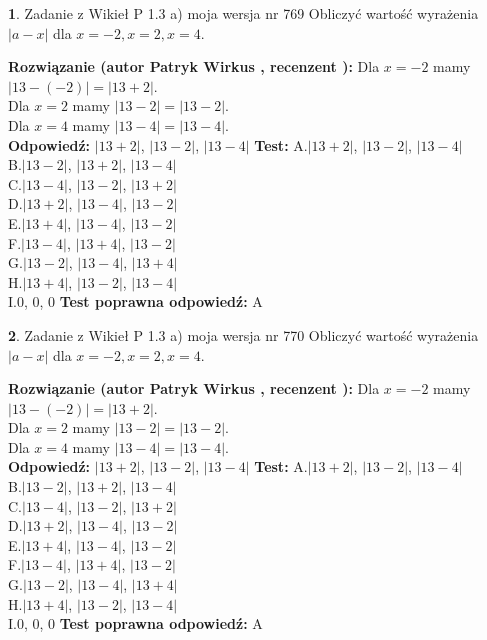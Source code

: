 \documentclass[12pt, a4paper]{article}
\theoremstyle{definition} %
\newtheorem{zad}{}
\newcommand{\zadStart}[1]{\begin{zad}#1\newline}
\newcommand{\zadStop}{\end{zad}}
\newcommand{\rozwStart}[2]{\noindent \textbf{Rozwiązanie (autor #1 , recenzent #2): }\newline}
\newcommand{\rozwStop}{\newline}
\newcommand{\odpStart}{\noindent \textbf{Odpowiedź:}\newline}
\newcommand{\odpStop}{\newline}
\newcommand{\testStart}{\noindent \textbf{Test:}\newline}
\newcommand{\testStop}{\newline}
\newcommand{\kluczStart}{\noindent \textbf{Test poprawna odpowiedź:}\newline}
\newcommand{\kluczStop}{\newline}
\begin{document}
\zadStart{Zadanie z Wikieł P 1.3 a) moja wersja nr 769}
Obliczyć wartość wyrażenia $|a - x|$ dla $x=-2,x=2,x=4$.
\zadStop
\rozwStart{Patryk Wirkus}{}
Dla $x = -2$ mamy $|13 - (-2)| = |13 + 2|$.\\
Dla $x = 2$ mamy $|13 - 2| = |13 - 2|$.\\
Dla $x = 4$ mamy $|13 - 4| = |13 - 4|$.\\
\rozwStop
\odpStart
$|13 + 2|$, $|13 - 2|$, $|13 - 4|$
\odpStop
\testStart
A.$|13 + 2|$, $|13 - 2|$, $|13 - 4|$\\
B.$|13 - 2|$, $|13 + 2|$, $|13 - 4|$\\
C.$|13 - 4|$, $|13 - 2|$, $|13 + 2|$\\
D.$|13 + 2|$, $|13 - 4|$, $|13 - 2|$\\
E.$|13 + 4|$, $|13 - 4|$, $|13 - 2|$\\
F.$|13 - 4|$, $|13 + 4|$, $|13 - 2|$\\
G.$|13 - 2|$, $|13 - 4|$, $|13 + 4|$\\
H.$|13 + 4|$, $|13 - 2|$, $|13 - 4|$\\
I.$0$, $0$, $0$
\testStop
\kluczStart
A
\kluczStop



\zadStart{Zadanie z Wikieł P 1.3 a) moja wersja nr 770}
Obliczyć wartość wyrażenia $|a - x|$ dla $x=-2,x=2,x=4$.
\zadStop
\rozwStart{Patryk Wirkus}{}
Dla $x = -2$ mamy $|13 - (-2)| = |13 + 2|$.\\
Dla $x = 2$ mamy $|13 - 2| = |13 - 2|$.\\
Dla $x = 4$ mamy $|13 - 4| = |13 - 4|$.\\
\rozwStop
\odpStart
$|13 + 2|$, $|13 - 2|$, $|13 - 4|$
\odpStop
\testStart
A.$|13 + 2|$, $|13 - 2|$, $|13 - 4|$\\
B.$|13 - 2|$, $|13 + 2|$, $|13 - 4|$\\
C.$|13 - 4|$, $|13 - 2|$, $|13 + 2|$\\
D.$|13 + 2|$, $|13 - 4|$, $|13 - 2|$\\
E.$|13 + 4|$, $|13 - 4|$, $|13 - 2|$\\
F.$|13 - 4|$, $|13 + 4|$, $|13 - 2|$\\
G.$|13 - 2|$, $|13 - 4|$, $|13 + 4|$\\
H.$|13 + 4|$, $|13 - 2|$, $|13 - 4|$\\
I.$0$, $0$, $0$
\testStop
\kluczStart
A
\kluczStop
\end{document}
